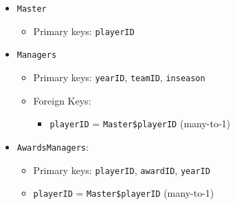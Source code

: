 \documentclass[]{book}
\providecommand{\tightlist}{%
  \setlength{\itemsep}{0pt}\setlength{\parskip}{0pt}}
\theoremstyle{plain}
\theoremstyle{remark}
\begin{document}
\begin{itemize}
\item
  \texttt{Master}

  \begin{itemize}
  \tightlist
  \item
    Primary keys: \texttt{playerID}
  \end{itemize}
\item
  \texttt{Managers}

  \begin{itemize}
  \item
    Primary keys: \texttt{yearID}, \texttt{teamID}, \texttt{inseason}
  \item
    Foreign Keys:

    \begin{itemize}
    \tightlist
    \item
      \texttt{playerID} = \texttt{Master\$playerID} (many-to-1)
    \end{itemize}
  \end{itemize}
\item
  \texttt{AwardsManagers}:

  \begin{itemize}
  \tightlist
  \item
    Primary keys: \texttt{playerID}, \texttt{awardID}, \texttt{yearID}
  \item
    \texttt{playerID} = \texttt{Master\$playerID} (many-to-1)
  \end{itemize}
\end{itemize}
\end{document}
